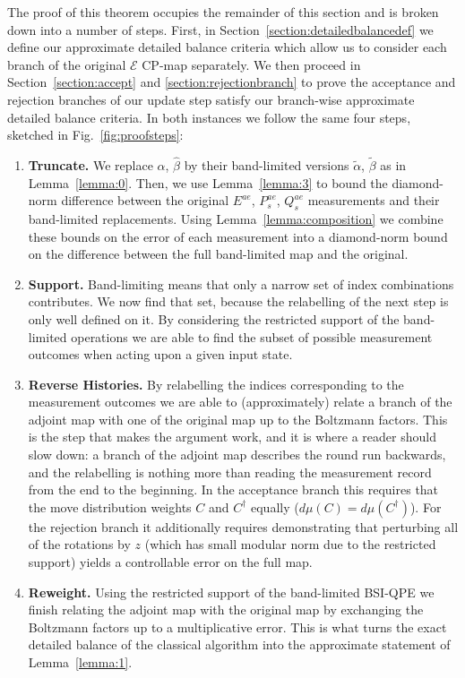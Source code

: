 \documentclass[aps,floatfix,10pt,amssymb,amsfont,amsmath,superscriptaddress,float,nofootinbib,longbibliography,nobalancelastpage,twocolumn]{revtex4-2}
\begin{document}
The proof of this theorem occupies the remainder of this section and is broken down into a number of steps. First, in Section~\ref{section:detailedbalancedef} we define our approximate detailed balance criteria which allow us to consider each branch of the original $\mathcal{E}$ CP-map separately. We then proceed in Section~\ref{section:accept} and \ref{section:rejectionbranch} to prove the acceptance and rejection branches of our update step satisfy our branch-wise approximate detailed balance criteria. In both instances we follow the same four steps, sketched in Fig.~\ref{fig:proofsteps}:
\begin{enumerate}
    \item \textbf{Truncate.} We replace $\hat \alpha$, $\hat \beta$ by their band-limited versions $\tilde \alpha$, $\tilde \beta$ as in Lemma~\ref{lemma:0}. Then, we use Lemma~\ref{lemma:3} to bound the diamond-norm difference between the original $E^{ae}$, $P_s^{ae}$, $Q_s^{ae}$ measurements and their band-limited replacements. Using Lemma~\ref{lemma:composition} we combine these bounds on the error of each measurement into a diamond-norm bound on the difference between the full band-limited map and the original.
    \item \textbf{Support.} Band-limiting means that only a narrow set of index combinations contributes. We now find that set, because the relabelling of the next step is only well defined on it. By considering the restricted support of the band-limited operations we are able to find the subset of possible measurement outcomes when acting upon a given input state.
    \item \textbf{Reverse Histories.} By relabelling the indices corresponding to the measurement outcomes we are able to (approximately) relate a branch of the adjoint map with one of the original map up to the Boltzmann factors. This is the step that makes the argument work, and it is where a reader should slow down: a branch of the adjoint map describes the round run backwards, and the relabelling is nothing more than reading the measurement record from the end to the beginning. In the acceptance branch this requires that the move distribution weights $C$ and $C^{\dagger}$ equally ($d\mu(C) = d\mu(C^{\dagger})$). For the rejection branch it additionally requires demonstrating that perturbing all of the rotations by $z$ (which has small modular norm due to the restricted support) yields a controllable error on the full map.
    \item \textbf{Reweight.} Using the restricted support of the band-limited BSI-QPE we finish relating the adjoint map with the original map by exchanging the Boltzmann factors up to a multiplicative error. This is what turns the exact detailed balance of the classical algorithm into the approximate statement of Lemma~\ref{lemma:1}.
\end{enumerate}
\end{document}
